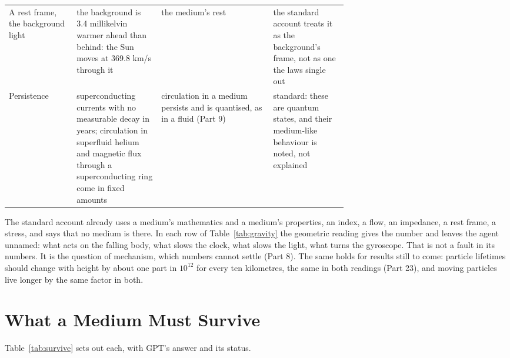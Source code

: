 \documentclass[11pt,a4paper]{article}
\begin{document}
\begin{table}[p]
\begin{tabularx}{\linewidth}{@{}>{\raggedright\arraybackslash}p{0.2\linewidth} >{\raggedright\arraybackslash}p{0.25\linewidth} >{\raggedright\arraybackslash}X >{\raggedright\arraybackslash}p{0.22\linewidth}@{}}
A rest frame, the background light & the background is 3.4 millikelvin warmer ahead than behind: the Sun moves at 369.8 km/s through it & the medium's rest & the standard account treats it as the background's frame, not as one the laws single out\\
Persistence & superconducting currents with no measurable decay in years; circulation in superfluid helium and magnetic flux through a superconducting ring come in fixed amounts & circulation in a medium persists and is quantised, as in a fluid (Part 9) & standard: these are quantum states, and their medium-like behaviour is noted, not explained\\\bottomrule
\end{tabularx}\label{tab:light}\end{table}

\nocite{lebedev1901,nichols1901,lamoreaux1997,jaffe2005,planck2020dipole,file1963,vinen1961,rashadaPart7}

 The standard account already uses a medium's mathematics and a medium's properties, an index, a flow, an impedance, a rest frame, a stress, and says that no medium is there. In each row of Table~\ref{tab:gravity} the geometric reading gives the number and leaves the agent unnamed: what acts on the falling body, what slows the clock, what slows the light, what turns the gyroscope. That is not a fault in its numbers. It is the question of mechanism, which numbers cannot settle (Part 8). The same holds for results still to come: particle lifetimes should change with height by about one part in $10^{12}$ for every ten kilometres, the same in both readings (Part 23), and moving particles live longer by the same factor in both.

\section{What a Medium Must Survive}\label{sec:survive}

 Table~\ref{tab:survive} sets out each, with GPT's answer and its status.
\end{document}
